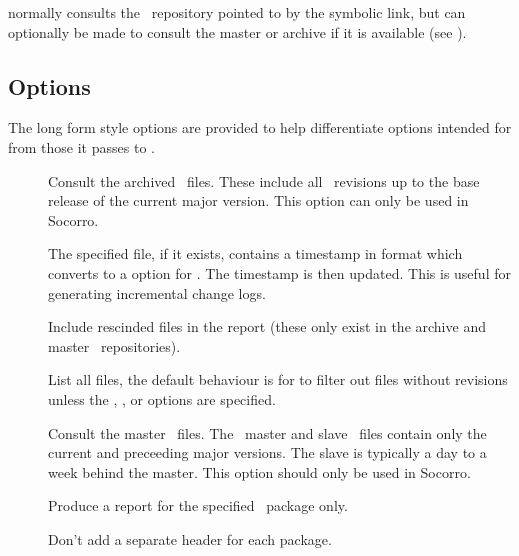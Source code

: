  normally consults the \rcs\ repository pointed to by the
 symbolic link, but can optionally be made to consult the
master or archive if it is available (see ).

\subsection*{Options}

The long form  style options are provided to help differentiate
options intended for  from those it passes to .

\begin{description}
\item[]
   Consult the archived \rcs\ files.  These include all \rcs\ revisions up to
   the base release of the current major version.  This option can only be
   used in Socorro.

\item[]
   The specified file, if it exists, contains a timestamp in 
   format which  converts to a  option for
   .  The timestamp is then updated.  This is useful for
   generating incremental change logs.

\item[]
   Include rescinded files in the report (these only exist in the archive and
   master \rcs\ repositories).

\item[]
   List all files, the default behaviour is for  to filter out files
   without revisions unless the , , or  
   options are specified.

\item[]
   Consult the master \rcs\ files.  The \aipspp\ master and slave
   \rcs\ files contain only the current and preceeding major versions.  The
   slave is typically a day to a week behind the master.  This option should
   only be used in Socorro.

\item[]
   Produce a report for the specified \aipspp\ package only.

\item[]
   Don't add a separate header for each package.
\end{description}

